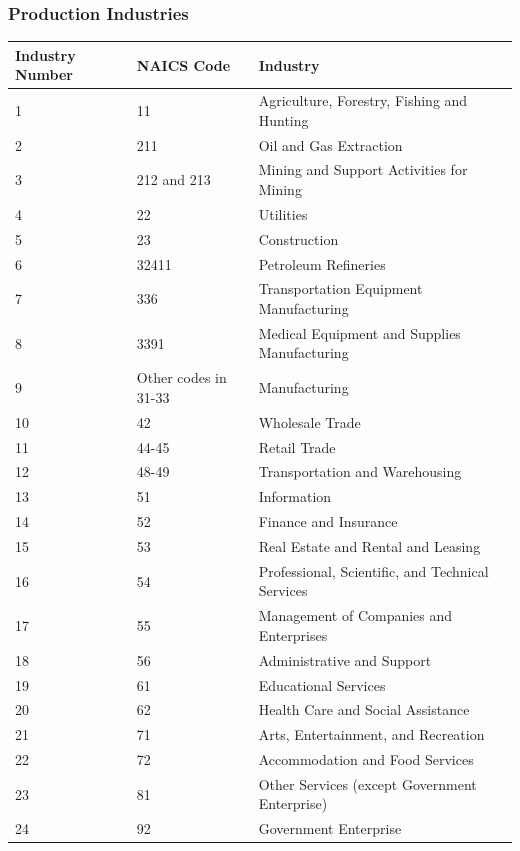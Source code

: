 \documentclass{beamer}
\begin{document}
    \begin{frame}
    \frametitle{Production Industries} 
\begin{table}[htbp]
  \centering
  \tiny
    \begin{tabular}{lll}
    \hline
    \hline
    Industry Number & NAICS Code & Industry \\
    \hline
    1     & 11    & Agriculture, Forestry, Fishing and Hunting \\
    2     & 211   & Oil and Gas Extraction \\
    3     & 212 and 213 & Mining and Support Activities for Mining \\
    4     & 22    & Utilities \\
    5     & 23    & Construction \\
    6     & 32411 & Petroleum Refineries \\
    7     & 336   & Transportation Equipment Manufacturing \\
    8     & 3391  & Medical Equipment and Supplies Manufacturing \\
    9     & Other codes in 31-33 & Manufacturing \\
    10    & 42    & Wholesale Trade \\
    11    & 44-45 & Retail Trade \\
    12    & 48-49 & Transportation and Warehousing \\
    13    & 51    & Information \\
    14    & 52    & Finance and Insurance \\
    15    & 53    & Real Estate and Rental and Leasing \\
    16    & 54    & Professional, Scientific, and Technical Services \\
    17    & 55    & Management of Companies and Enterprises \\
    18    & 56    & Administrative and Support \\
    19    & 61    & Educational Services \\
    20    & 62    & Health Care and Social Assistance \\
    21    & 71    & Arts, Entertainment, and Recreation \\
    22    & 72    & Accommodation and Food Services \\
    23    & 81    & Other Services (except Government Enterprise) \\
    24    & 92    & Government Enterprise \\
    \hline
    \hline
    \end{tabular}%
  \label{tab:addlabel}%
\end{table}%
\end{frame}
\end{document}
